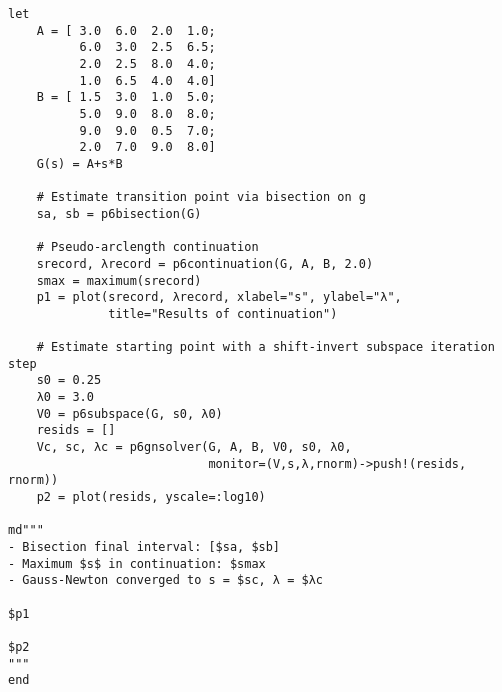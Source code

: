 \documentclass[12pt, leqno]{article} %
\begin{document}
\begin{verbatim}
let
    A = [ 3.0  6.0  2.0  1.0;
          6.0  3.0  2.5  6.5;
          2.0  2.5  8.0  4.0;
          1.0  6.5  4.0  4.0]
    B = [ 1.5  3.0  1.0  5.0;
          5.0  9.0  8.0  8.0;
          9.0  9.0  0.5  7.0;
          2.0  7.0  9.0  8.0]
    G(s) = A+s*B

    # Estimate transition point via bisection on g
    sa, sb = p6bisection(G)

    # Pseudo-arclength continuation
    srecord, λrecord = p6continuation(G, A, B, 2.0)
    smax = maximum(srecord)
    p1 = plot(srecord, λrecord, xlabel="s", ylabel="λ",
              title="Results of continuation")

    # Estimate starting point with a shift-invert subspace iteration step
    s0 = 0.25
    λ0 = 3.0
    V0 = p6subspace(G, s0, λ0)
    resids = []
    Vc, sc, λc = p6gnsolver(G, A, B, V0, s0, λ0,
                            monitor=(V,s,λ,rnorm)->push!(resids, rnorm))
    p2 = plot(resids, yscale=:log10)

md"""
- Bisection final interval: [$sa, $sb]
- Maximum $s$ in continuation: $smax
- Gauss-Newton converged to s = $sc, λ = $λc

$p1

$p2
"""
end
\end{verbatim}
\end{document}
